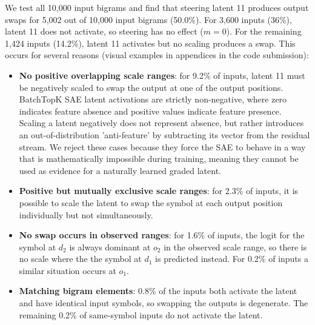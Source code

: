 We test all 10,000 input bigrams and find that steering latent 11 produces output swaps for 5,002 out of 10,000 input bigrams (50.0\%). For 3,600 inputs (36\%), latent 11 does not activate, so steering has no effect ($m=0$). For the remaining 1,424 inputs (14.2\%), latent 11 activates but no scaling produces a swap. This occurs for several reasons (visual examples in appendices in the code submission):
\begin{itemize}
    \item \textbf{No positive overlapping scale ranges}: for 9.2\% of inputs, latent 11 must be negatively scaled to swap the output at one of the output positions.
    BatchTopK SAE latent activations are strictly non-negative, where zero indicates feature absence and positive values indicate feature presence. Scaling a latent negatively does not represent absence, but rather introduces an out-of-distribution 'anti-feature' by subtracting its vector from the residual stream. We reject these cases because they force the SAE to behave in a way that is mathematically impossible during training, meaning they cannot be used as evidence for a naturally learned graded latent.
    \item \textbf{Positive but mutually exclusive scale ranges}: for 2.3\% of inputs, it is possible to scale the latent to swap the symbol at each output position individually but not simultaneously.
    \item \textbf{No swap occurs in observed ranges}: for 1.6\% of inputs, the logit for the symbol at $d_2$ is always dominant at $o_2$ in the observed scale range, so there is no scale where the the symbol at $d_1$ is predicted instead. 
    For 0.2\% of inputs a similar situation occurs at $o_1$.
    \item \textbf{Matching bigram elements}: 0.8\% of the inputs both activate the latent and 
    have identical input symbols, so swapping the outputs is degenerate. The 
    remaining 0.2\% of same-symbol inputs do not activate the latent.
\end{itemize}


